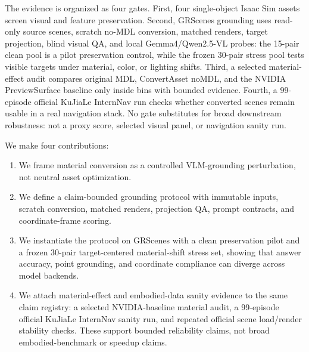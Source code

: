 The evidence is organized as four gates. First, four single-object Isaac Sim
assets screen visual and feature preservation. Second, GRScenes grounding uses
read-only source scenes, scratch no-MDL conversion, matched renders, target
projection, blind visual QA, and local Gemma4/Qwen2.5-VL probes: the 15-pair
clean pool is a pilot preservation control, while the frozen 30-pair stress pool
tests visible targets under material, color, or lighting shifts. Third, a
selected material-effect audit compares original MDL, ConvertAsset noMDL, and
the NVIDIA PreviewSurface baseline only inside bins with bounded evidence.
Fourth, a 99-episode official KuJiaLe InternNav run checks whether converted
scenes remain usable in a real navigation stack. No gate substitutes for broad
downstream robustness: not a proxy score, selected visual panel, or navigation
sanity run.


We make four contributions:
\begin{enumerate}
    \item We frame material conversion as a controlled VLM-grounding
    perturbation, not neutral asset optimization.
    \item We define a claim-bounded grounding protocol with immutable inputs,
    scratch conversion, matched renders, projection QA, prompt contracts, and
    coordinate-frame scoring.
    \item We instantiate the protocol on GRScenes with a clean preservation
    pilot and a frozen 30-pair target-centered material-shift stress set,
    showing that answer accuracy, point grounding, and coordinate compliance
    can diverge across model backends.
    \item We attach material-effect and embodied-data sanity evidence to the
    same claim registry: a selected NVIDIA-baseline material audit, a
    99-episode official KuJiaLe InternNav sanity run, and repeated official
    scene load/render stability checks. These support bounded reliability
    claims, not broad embodied-benchmark or speedup claims.
\end{enumerate}
